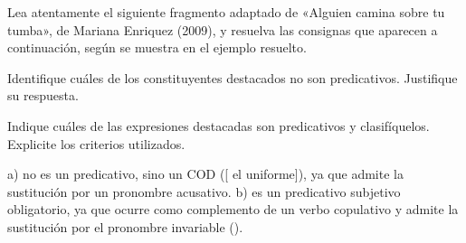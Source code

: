 \begin{ejercicio}\label{ej:09-enriquez}
Lea atentamente el siguiente fragmento adaptado de «Alguien camina sobre tu
tumba», de Mariana Enriquez (2009), y resuelva las consignas que aparecen a
continuación, según se muestra en el ejemplo resuelto.

\begin{consignas}
  \item Identifique cuáles de los constituyentes destacados no son
        predicativos. Justifique su respuesta.
  \item Indique cuáles de las expresiones destacadas son predicativos y
        clasifíquelos. Explicite los criterios utilizados.
\end{consignas}


\begin{resuelto}
a)  no es un predicativo, sino un COD ([ el
uniforme]), ya que admite la sustitución por un pronombre acusativo. b)
 es un predicativo subjetivo obligatorio, ya que ocurre como
complemento de un verbo copulativo y admite la sustitución por el pronombre
invariable  ().
\end{resuelto}
\end{ejercicio}

